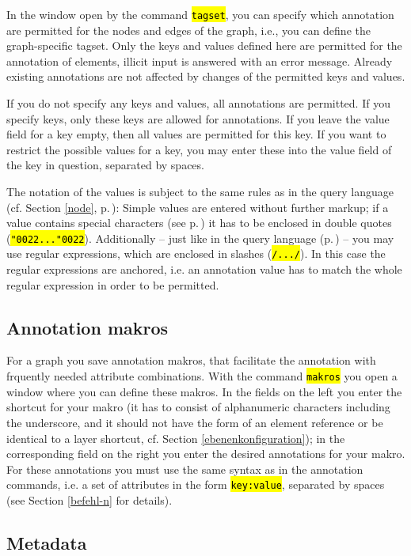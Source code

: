 \documentclass[12pt]{scrartcl}
\newcommand{\quo}{\char"0022}
\newcommand{\code}[1]{\hl{\texttt{#1}}}
\begin{document}
In the window open by the command \code{tagset}, you can specify which annotation are permitted for the nodes and edges of the graph, i.e., you can define the graph-specific tagset.
Only the keys and values defined here are permitted for the annotation of elements, illicit input is answered with an error message.
Already existing annotations are not affected by changes of the permitted keys and values.

If you do not specify any keys and values, all annotations are permitted.
If you specify keys, only these keys are allowed for annotations.
If you leave the value field for a key empty, then all values are permitted for this key.
If you want to restrict the possible values for a key, you may enter these into the value field of the key in question, separated by spaces.

The notation of the values is subject to the same rules as in the query language (cf. Section \ref{node}, p.\,\pageref{zeichenketten}):
Simple values are entered without further markup; if a value contains special characters (see p.\,\pageref{zeichenketten}) it has to be enclosed in double quotes (\code{\quo...\quo}).
Additionally – just like in the query language (p.\,\pageref{zeichenketten}) – you may use regular expressions, which are enclosed in slashes (\code{/.../}).
In this case the regular expressions are anchored, i.e. an annotation value has to match the whole regular expression in order to be permitted.

\subsection{Annotation makros}\label{annotationsmakros}

For a graph you save annotation makros, that facilitate the annotation with frquently needed attribute combinations.
With the command \code{makros} you open a window where you can define these makros.
In the fields on the left you enter the shortcut for your makro (it has to consist of alphanumeric characters including the underscore, and it should not have the form of an element reference or be identical to a layer shortcut, cf. Section \ref{ebenenkonfiguration}); in the corresponding field on the right you enter the desired annotations for your makro.
For these annotations you must use the same syntax as in the annotation commands, i.e. a set of attributes in the form \code{key:value}, separated by spaces (see Section \ref{befehl-n} for details).

\subsection{Metadata}
\end{document}
